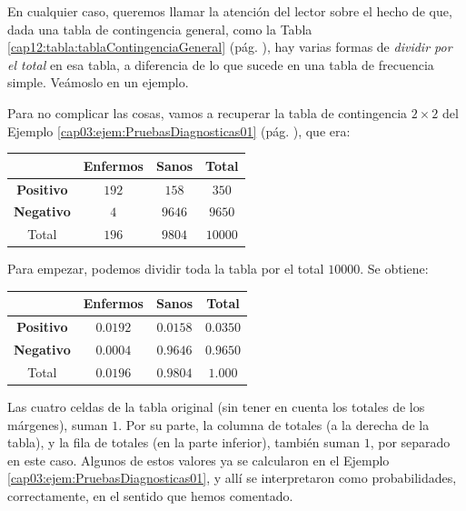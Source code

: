 En cualquier caso, queremos llamar la atención del lector sobre el hecho de que, dada una tabla de contingencia general, como la Tabla \ref{cap12:tabla:tablaContingenciaGeneral} (pág. \pageref{cap12:tabla:tablaContingenciaGeneral}), hay varias formas de {\em dividir por el total} en esa tabla, a diferencia de lo que sucede en una tabla de frecuencia simple.  Veámoslo en un ejemplo.
\begin{ejemplo}
\label{cap12:ejem:tablasContingenciaRelativas}	
Para no complicar las cosas, vamos a recuperar la tabla de contingencia $2\times 2$ del  Ejemplo \ref{cap03:ejem:PruebasDiagnosticas01} (pág. \pageref{cap03:ejem:PruebasDiagnosticas01}), que era:
    \begin{center}
    \begin{tabular}{|c|c|c|c|}
      \hline
       &{\bf Enfermos }&{\bf Sanos }& Total \\
       \hline
      {\bf Positivo} & $192$&  $158$&  $350$\\
      \hline
      {\bf Negativo }&  $4$ & $9646$&  $9650$\\
      \hline
      Total    & $196$& $9804$& $10000$\\
      \hline
    \end{tabular}
    \end{center}
Para empezar, podemos dividir toda la tabla por el total $10000$. Se obtiene:
    \begin{center}
    \begin{tabular}{|c|c|c|c|}
      \hline
       &{\bf Enfermos }&{\bf Sanos }& Total \\
       \hline
      {\bf Positivo} & $0.0192$ & $0.0158$ & $0.0350$ \\
      \hline
      {\bf Negativo }&  $0.0004$ & $0.9646$ & $0.9650$ \\
      \hline
      Total    & $0.0196$ & $0.9804$ & $1.000$ \\
      \hline
    \end{tabular}
    \end{center}
Las cuatro celdas de la tabla original (sin tener en cuenta los totales de los márgenes), suman $1$.  Por su parte, la columna de totales (a la derecha de la tabla), y la fila de totales (en la parte inferior), también suman $1$,  por separado en este caso. Algunos de estos valores ya se calcularon en el Ejemplo \ref{cap03:ejem:PruebasDiagnosticas01}, y allí se interpretaron como probabilidades, correctamente, en el sentido que hemos comentado.


\end{ejemplo}
